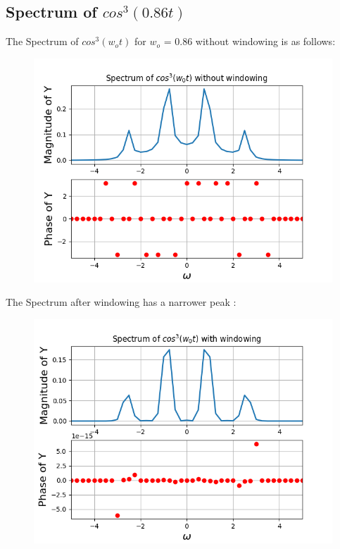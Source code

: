\documentclass[11pt, a4paper]{article}
\begin{document}
\subsection*{Spectrum of $cos^3(0.86t)$}
The Spectrum of $cos^3(w_ot)$ for $w_o$ = 0.86 without windowing is as follows:

\begin{figure}[!tbh]
\centering
\includegraphics[scale=0.72]{assgn10_plot8.png} 
\label{fig8}
\end{figure} 

The Spectrum after windowing has a narrower peak :
\begin{figure}[!tbh]
\centering
\includegraphics[scale=0.72]{assgn10_plot9.png} 
\label{fig9}
\end{figure} 
\end{document}

